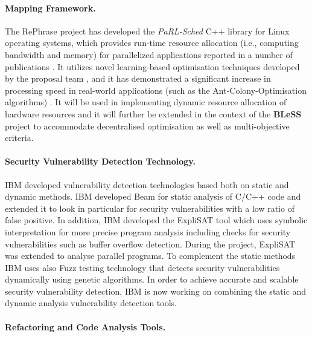 \documentclass[a4paper,11pt]{article}
\newcommand{\project}[1]{\textbf{#1}\xspace}
\newcommand{\BLESS}{\project{BLeSS}}
\newcommand{\TheProject}{\BLESS}
\begin{document}
\paragraph{\SCCHshort{} \RePhrase Mapping Framework.} The RePhrase project has developed the \emph{PaRL-Sched} C++ library for Linux operating systems, which provides run-time resource allocation (i.e., computing bandwidth and memory) for parallelized applications reported in a number of publications \cite{chasparis_pinning_applications_2017,chasparis_efficient_2017}. It utilizes novel learning-based optimisation techniques developed by the proposal team \cite{chasparis_stochastic_2017_acc}, and it has demonstrated a significant increase in processing speed in real-world applications (such as the Ant-Colony-Optimisation algorithms) \cite{chasparis_pinning_applications_2017}. It will be used in implementing dynamic resource allocation of hardware resources and it will further be extended in the context of the \TheProject{} project to accommodate decentralised optimisation as well as multi-objective criteria.

\paragraph{\IBM{} Security Vulnerability Detection Technology.}

IBM developed vulnerability detection technologies based both on static and dynamic methods. IBM developed Beam for static analysis of C/C++ code and extended it to look in particular for security vulnerabilities with a low ratio of false positive. In addition, IBM developed the ExpliSAT tool which uses symbolic interpretation for more precise program analysis including checks for security vulnerabilities such as buffer overflow detection. During the \RePhrase{} project, ExpliSAT was extended to analyse parallel programs. To complement the static methods IBM uses also Fuzz testing technology that detects security vulnerabilities dynamically using genetic algorithms. In order to achieve accurate and scalable security vulnerability detection, IBM is now working on combining the static and dynamic analysis vulnerability detection tools.     

\paragraph{\SAshort{} \paraformance Refactoring and Code Analysis Tools.}
\end{document}
